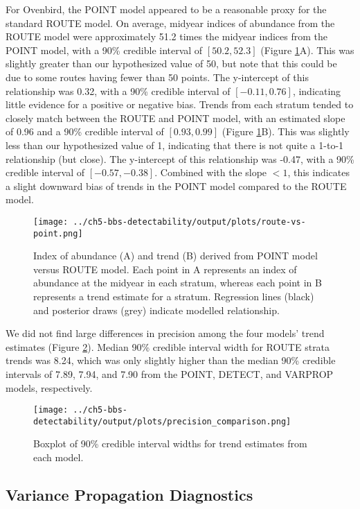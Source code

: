 \par For Ovenbird, the POINT model appeared to be a reasonable proxy for the standard ROUTE model.
On average, midyear indices of abundance from the ROUTE model were approximately 51.2 times the midyear indices from the POINT model, with a 90\% credible interval of $[50.2, 52.3]$ (Figure \ref{fig:route-vs-point}A).
This was slightly greater than our hypothesized value of 50, but note that this could be due to some routes having fewer than 50 points.
The y-intercept of this relationship was 0.32, with a 90\% credible interval of $[-0.11, 0.76]$, indicating little evidence for a positive or negative bias.
Trends from each stratum tended to closely match between the ROUTE and POINT model, with an estimated slope of 0.96 and a 90\% credible interval of $[0.93, 0.99]$ (Figure \ref{fig:route-vs-point}B).
This was slightly less than our hypothesized value of 1, indicating that there is not quite a 1-to-1 relationship (but close).
The y-intercept of this relationship was -0.47, with a 90\% credible interval of $[-0.57, -0.38]$.
Combined with the slope $< 1$, this indicates a slight downward bias of trends in the POINT model compared to the ROUTE model.

\begin{figure}[h]
	\texttt{[image: ../ch5-bbs-detectability/output/plots/route-vs-point.png]}
	\caption{Index of abundance (A) and trend (B) derived from POINT model versus ROUTE model. Each point in A represents an index of abundance at the midyear in each stratum, whereas each point in B represents a trend estimate for a stratum. Regression lines (black) and posterior draws (grey) indicate modelled relationship.}
	\label{fig:route-vs-point}
\end{figure}

\par We did not find large differences in precision among the four models' trend estimates (Figure \ref{fig:precision}).
Median 90\% credible interval width for ROUTE strata trends was 8.24, which was only slightly higher than the median 90\% credible intervals of 7.89, 7.94, and 7.90 from the POINT, DETECT, and VARPROP models, respectively. 


\begin{figure}[h]
	\texttt{[image: ../ch5-bbs-detectability/output/plots/precision\_comparison.png]}
	\caption{Boxplot of 90\% credible interval widths for trend estimates from each model.}
	\label{fig:precision}
\end{figure}

\subsection{Variance Propagation Diagnostics}

